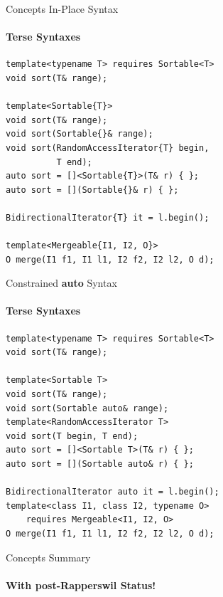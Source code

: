 \documentclass{beamer}
\begin{document}
    \begin{frame}[fragile]{Concepts In-Place Syntax}
        \framesubtitle{Terse Syntaxes}
        \begin{center}
        \begin{lstlisting}
template<typename T> requires Sortable<T>
void sort(T& range);

template<Sortable{T}>
void sort(T& range);
void sort(Sortable{}& range);
void sort(RandomAccessIterator{T} begin,
          T end);
auto sort = []<Sortable{T}>(T& r) { };
auto sort = [](Sortable{}& r) { };

BidirectionalIterator{T} it = l.begin();

template<Mergeable{I1, I2, O}>
O merge(I1 f1, I1 l1, I2 f2, I2 l2, O d); \end{lstlisting}
        \end{center}
    \end{frame}

    \begin{frame}[fragile]{Constrained \textbf{auto} Syntax}
        \framesubtitle{Terse Syntaxes}
        \begin{center}
        \begin{lstlisting}
template<typename T> requires Sortable<T>
void sort(T& range);

template<Sortable T>
void sort(T& range);
void sort(Sortable auto& range);
template<RandomAccessIterator T>
void sort(T begin, T end);
auto sort = []<Sortable T>(T& r) { };
auto sort = [](Sortable auto& r) { };

BidirectionalIterator auto it = l.begin();
template<class I1, class I2, typename O>
    requires Mergeable<I1, I2, O>
O merge(I1 f1, I1 l1, I2 f2, I2 l2, O d); \end{lstlisting}
        \end{center}
    \end{frame}

    \begin{frame}[fragile]{Concepts Summary}
        \framesubtitle{With post-Rapperswil Status!}
    \end{frame}
\end{document}
